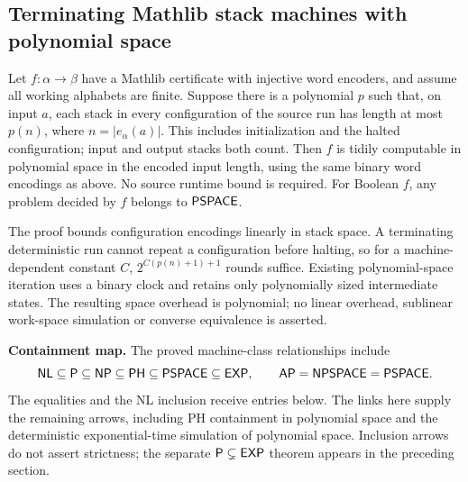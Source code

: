\begin{result}
\subsection{Terminating Mathlib stack machines with polynomial space}
Let $f:\alpha\to\beta$ have a Mathlib  certificate with injective word
encoders, and assume all working alphabets are finite. Suppose there is a polynomial $p$ such
that, on input $a$, each stack in every configuration of the source run has length at most
$p(n)$, where $n=|e_\alpha(a)|$. This includes initialization and the halted configuration;
input and output stacks both count. Then $f$ is tidily computable in polynomial space in the
encoded input length, using the same binary word encodings as above. No source runtime bound
is required. For Boolean $f$, any problem decided by $f$ belongs to $\mathsf{PSPACE}$.

The proof bounds configuration encodings linearly in stack space. A terminating deterministic
run cannot repeat a configuration before halting, so for a machine-dependent constant $C$,
$2^{C(p(n)+1)+1}$ rounds suffice. Existing polynomial-space iteration uses a binary clock and
retains only polynomially sized intermediate states. The resulting space overhead is polynomial;
no linear overhead, sublinear work-space simulation or converse equivalence is asserted.
\cite{Sipser2013,AroraBarak09}
\end{result}

\begin{result}
\textbf{Containment map.}
The proved machine-class relationships include
\[
\mathsf{NL}\subseteq\mathsf{P}\subseteq\mathsf{NP}\subseteq\mathsf{PH}
\subseteq\mathsf{PSPACE}\subseteq\mathsf{EXP},
\qquad \mathsf{AP}=\mathsf{NPSPACE}=\mathsf{PSPACE}.
\]
The equalities and the NL inclusion receive entries below. The links here supply
the remaining arrows, including PH containment in polynomial space and the
deterministic exponential-time simulation of polynomial space. Inclusion arrows do not assert strictness;
the separate $\mathsf{P}\subsetneq\mathsf{EXP}$ theorem appears in the preceding section.
\citep{AroraBarak09,Sipser2013}
\end{result}

